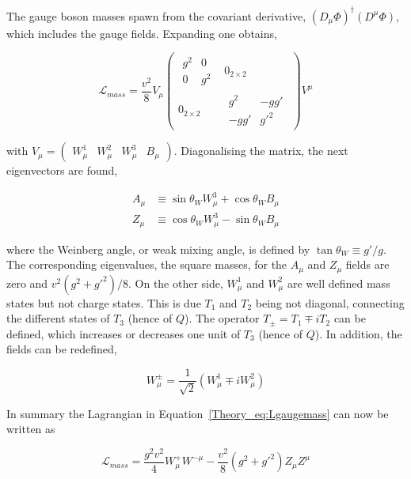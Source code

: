 The gauge boson masses spawn from the covariant derivative, $(D_\mu\Phi)^\dag(D^\mu\Phi)$, which includes the gauge fields. Expanding one obtains,

\begin{equation}
\label{Theory_eq:Lgaugemass}
\mathcal{L}_{mass} = \frac{v^2}{8}
V_\mu
\begin{pmatrix} \begin{matrix} g^2 & 0 \\ 0 & g^2 \end{matrix} & 0_{2\times2} \\ 0_{2\times2} & \begin{matrix} g^2 & -gg' \\ -gg' & g'^2 \end{matrix}
\end{pmatrix} V^\mu 
\end{equation}

with $V_\mu = \begin{pmatrix} W_\mu^1 & W_\mu^2 & W_\mu^3 & B_\mu
\end{pmatrix}$. Diagonalising the matrix, the next eigenvectors are found,

\begin{equation}
\begin{split}
    A_\mu &\equiv \sin\theta_W W_\mu^3 + \cos\theta_WB_\mu \\
    Z_\mu &\equiv \cos\theta_W W_\mu^3 - \sin\theta_WB_\mu  
\end{split}
\end{equation}

where the Weinberg angle, or weak mixing angle, is defined by $\tan\theta_W\equiv g'/g$. The corresponding eigenvalues, the square masses, for the $A_\mu$ and $Z_\mu$ fields are zero and $v^2(g^2+g'^2)/8$. On the other side, $W_\mu^1$ and $W_\mu^2$ are well defined mass states but not charge states. This is due $T_1$ and $T_2$ being not diagonal, connecting the different states of $T_3$ (hence of $Q$). The operator $T_\pm=T_1\mp iT_2$ can be defined, which increases or decreases one unit of $T_3$ (hence of $Q$). In addition, the fields can be redefined,

\begin{equation}
    W_\mu^\pm = \frac{1}{\sqrt{2}}(W_\mu^1\mp i W_\mu^2)
\end{equation}

In summary the Lagrangian in Equation~\ref{Theory_eq:Lgaugemass} can now be written as

\begin{equation}
    \mathcal{L}_{mass} = \frac{g^2v^2}{4}W_\mu^+W^{- \mu} - \frac{v^2}{8}(g^2+g'^2)Z_\mu Z^\mu
\end{equation}

